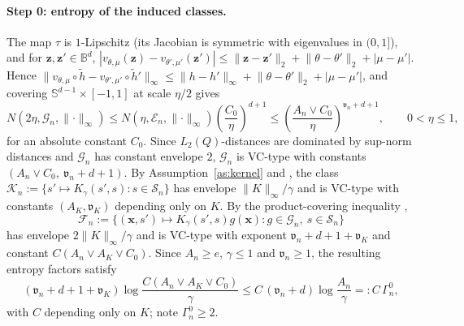 \paragraph{Step 0: entropy of the induced classes.}
The map $\tau$ is $1$-Lipschitz (its Jacobian is symmetric with eigenvalues in $(0,1]$), and for $\mathbf{z},\mathbf{z}'\in\mathbb{B}^d$,
$|v_{\theta,\mu}(\mathbf{z})-v_{\theta',\mu'}(\mathbf{z}')|\le\lVert\mathbf{z}-\mathbf{z}'\rVert_2+\lVert\theta-\theta'\rVert_2+|\mu-\mu'|$.  Hence
$\lVert v_{\theta,\mu}\circ\widetilde{h}-v_{\theta',\mu'}\circ\widetilde{h}'\rVert_\infty\le\lVert h-h'\rVert_\infty+\lVert\theta-\theta'\rVert_2+|\mu-\mu'|$, and covering $\mathbb{S}^{d-1}\times[-1,1]$ at scale $\eta/2$ gives
\[
  N(2\eta,\mathcal{G}_n,\lVert\cdot\rVert_\infty)
  \le N(\eta,\mathcal{E}_n,\lVert\cdot\rVert_\infty)\left(\frac{C_0}{\eta}\right)^{d+1}
  \le\left(\frac{A_n\vee C_0}{\eta}\right)^{\mathfrak{v}_n+d+1},
  \qquad 0<\eta\le1,
\]
for an absolute constant $C_0$.  Since $L_2(Q)$-distances are dominated by sup-norm distances and $\mathcal{G}_n$ has constant envelope $2$, $\mathcal{G}_n$ is VC-type with constants $(A_n\vee C_0,\ \mathfrak{v}_n+d+1)$.  By Assumption~\ref{as:kernel} and \citet[Lemma~22]{nolan1987u}, the class $\mathcal{K}_n:=\{s'\mapsto K_{\gamma}(s',s):s\in\mathcal{S}_n\}$ has envelope $\lVert K\rVert_\infty/\gamma$ and is VC-type with constants $(A_K,\mathfrak{v}_K)$ depending only on $K$.  By the product-covering inequality \citep[Corollary~A.1(i)]{chernozhukov2014gaussian},
\[
  \mathcal{F}_n:=\{(\mathbf{x},s')\mapsto K_{\gamma}(s',s)g(\mathbf{x}):
   g\in\mathcal{G}_n,\ s\in\mathcal{S}_n\}
\]
has envelope $2\lVert K\rVert_\infty/\gamma$ and is VC-type with exponent $\mathfrak{v}_n+d+1+\mathfrak{v}_K$ and constant $C(A_n\vee A_K\vee C_0)$.  Since $A_n\ge e$, $\gamma\le1$ and $\mathfrak{v}_n\ge1$, the resulting entropy factors satisfy
\begin{equation}
  (\mathfrak{v}_n+d+1+\mathfrak{v}_K)
  \log\frac{C(A_n\vee A_K\vee C_0)}{\gamma}
  \le C\,(\mathfrak{v}_n+d)\log\frac{A_n}{\gamma}
  =:C\,\Gamma_{n}^{0},
  \label{eq:entropy-factor}
\end{equation}
with $C$ depending only on $K$; note $\Gamma_n^0\ge2$.

